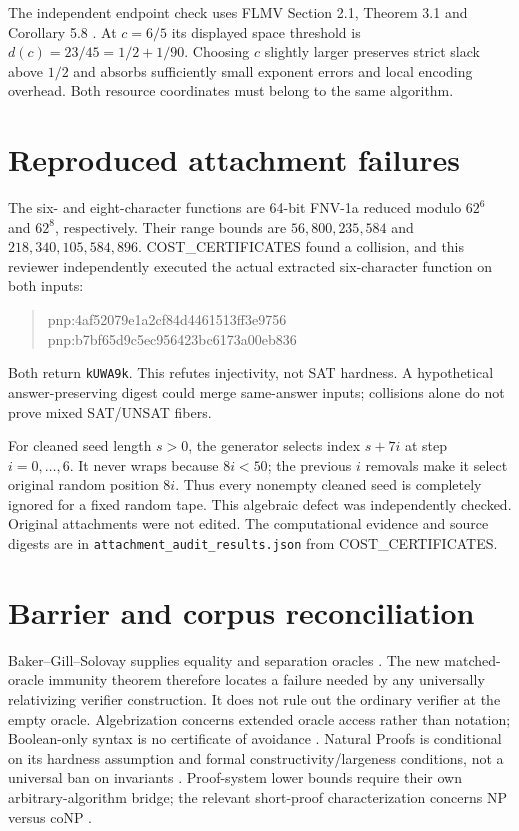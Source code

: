 \documentclass[11pt]{article}
\begin{document}
The independent endpoint check uses FLMV Section 2.1, Theorem 3.1 and
Corollary 5.8 \cite{flmv}. At $c=6/5$ its displayed space threshold is
$d(c)=23/45=1/2+1/90$. Choosing $c$ slightly larger preserves strict slack
above $1/2$ and absorbs sufficiently small exponent errors and local encoding
overhead. Both resource coordinates must belong to the same algorithm.

\section*{Reproduced attachment failures}
The six- and eight-character functions are 64-bit FNV-1a reduced modulo
$62^6$ and $62^8$, respectively. Their range bounds are
$56{,}800{,}235{,}584$ and $218{,}340{,}105{,}584{,}896$.
COST\_CERTIFICATES found a collision, and this reviewer independently
executed the actual extracted six-character function on both inputs:
\begin{quote}\ttfamily
pnp:4af52079e1a2cf84d4461513ff3e9756\\
pnp:b7bf65d9c5ec956423bc6173a00eb836
\end{quote}
Both return \texttt{kUWA9k}. This refutes injectivity, not SAT hardness.
A hypothetical answer-preserving digest could merge same-answer inputs;
collisions alone do not prove mixed SAT/UNSAT fibers.

For cleaned seed length $s>0$, the generator selects index $s+7i$ at step
$i=0,\ldots,6$. It never wraps because $8i<50$; the previous $i$ removals
make it select original random position $8i$. Thus every nonempty cleaned
seed is completely ignored for a fixed random tape. This algebraic defect
was independently checked. Original attachments were not edited.
The computational evidence and source digests are in
\texttt{attachment\_audit\_results.json} from COST\_CERTIFICATES.

\section*{Barrier and corpus reconciliation}
Baker--Gill--Solovay supplies equality and separation oracles \cite{bgs}.
The new matched-oracle immunity theorem therefore locates a failure needed
by any universally relativizing verifier construction. It does not rule out
the ordinary verifier at the empty oracle.
Algebrization concerns extended oracle access rather than notation;
Boolean-only syntax is no certificate of avoidance \cite{aw}.
Natural Proofs is conditional on its hardness assumption and formal
constructivity/largeness conditions, not a universal ban on invariants
\cite{rr}. Proof-system lower bounds require their own arbitrary-algorithm
bridge; the relevant short-proof characterization concerns NP versus coNP
\cite{cr}.
\end{document}
